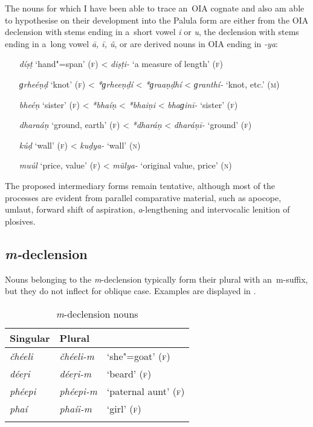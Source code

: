 The nouns for which I have been able to trace an~OIA cognate and also am able to hypothesise on their development into the Palula form are either from the OIA declension with stems ending in a~short vowel \textit{i} or \textit{u}, the declension with stems ending in a~long vowel \textit{ā, ī, ũ}, or are derived nouns in OIA ending in \textit{-ya}: 

\begin{itemize}[itemsep=0pt, leftmargin=]
\item[\textit{díṣṭ} `hand"=span' (\textsc{f})] {\textless} \textit{diṣṭi-} `a measure of length' (\textsc{f})
\item[\textit{ɡrheéṇḍ} `knot' (\textsc{f})] {\textless} \textit{*ɡrheeṇḍí} {\textless} \textit{*ɡraaṇḍhí} {\textless} \textit{ɡranthí-} `knot, etc.' (\textsc{m})
\item[\textit{bheéṇ} `sister' (\textsc{f})] {\textless} \textit{*bhaíṇ} {\textless} \textit{*bhaiṇi} {\textless} \textit{bhaɡinī-} `sister' (\textsc{f})
\item[\textit{dharaáṇ} `ground, earth' (\textsc{f})] {\textless} \textit{*dharáṇ} {\textless} \textit{dharáṇī-} `ground' (\textsc{f})
\item[\textit{kúḍ} `wall' (\textsc{f})] {\textless} \textit{kuḍya-} `wall' (\textsc{n})
\item[\textit{muúl} `price, value' (\textsc{f})] {\textless} \textit{mũlya-} `original value, price' (\textsc{n})
\end{itemize}

The proposed intermediary forms remain tentative, although most of the processes are evident from parallel comparative material, such as apocope, umlaut, forward shift of aspiration, \textit{a}-lengthening and intervocalic lenition of plosives.

\subsection{\textit{m-}declension}
\label{subsec:4-6-3}

Nouns belonging to the \textit{m}-declension typically form their plural with an~m-suffix, but they do not inflect for oblique case. Examples are displayed in . 


\begin{table}[ht]
\caption{\textit{m}-declension nouns}
\begin{tabularx}{.75\textwidth}{ Q Q l }
\lsptoprule
Singular &
Plural &
\\\hline
\textit{čhéeli } &
\textit{čhéeli-m} &
`she"=goat' (\textsc{f})\\
\textit{déeṛi} &
\textit{déeṛi-m} &
`beard' (\textsc{f})\\
\textit{phéepi} &
\textit{phéepi-m} &
`paternal aunt' (\textsc{f})\\
\textit{phaí} &
\textit{phaíi-m} &
`girl' (\textsc{f})\\\lspbottomrule
\end{tabularx}
\label{tab:4-16}
\end{table}

